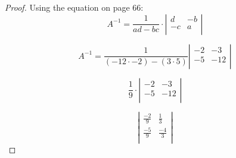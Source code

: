 \documentclass[8pt]{article}
\begin{document}
\begin{proof}
	Using the equation on page 66: \[A^{-1} = \frac{1}{ad-bc} \cdot \left| 
	\begin{array}{ccc}
	d & -b \\
	-c & a  \\
	\end{array} 
	\right|\]
	
	
	\[A^{-1} = \frac{1}{(-12 \cdot -2) - (3\cdot 5)}\left| 
	\begin{array}{ccc}
	-2 & -3 \\
	-5 & -12  \\
	\end{array} 
	\right|\]
	
	\[\frac{1}{9} \cdot \left| 
	\begin{array}{ccc}
	-2 & -3 \\
	-5 & -12  \\
	\end{array} 
	\right| \] 
	
	\[ \left| 
	\begin{array}{ccc}
	\frac{-2}{9} & \frac{1}{3} \\
	
	\frac{-5}{9} & \frac{-4}{3}  \\
	\end{array} 
	\right| \]
\end{proof}
\end{document}
